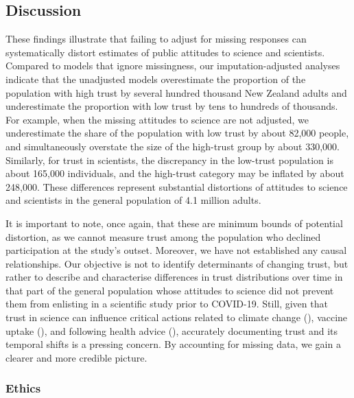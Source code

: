 \documentclass[
  single column]{article}
\begin{document}
\subsection{Discussion}\label{discussion}

These findings illustrate that failing to adjust for missing responses
can systematically distort estimates of public attitudes to science and
scientists. Compared to models that ignore missingness, our
imputation-adjusted analyses indicate that the unadjusted models
overestimate the proportion of the population with high trust by several
hundred thousand New Zealand adults and underestimate the proportion
with low trust by tens to hundreds of thousands. For example, when the
missing attitudes to science are not adjusted, we underestimate the
share of the population with low trust by about 82,000 people, and
simultaneously overstate the size of the high-trust group by about
330,000. Similarly, for trust in scientists, the discrepancy in the
low-trust population is about 165,000 individuals, and the high-trust
category may be inflated by about 248,000. These differences represent
substantial distortions of attitudes to science and scientists in the
general population of 4.1 million adults.

It is important to note, once again, that these are minimum bounds of
potential distortion, as we cannot measure trust among the population
who declined participation at the study's outset. Moreover, we have not
established any causal relationships. Our objective is not to identify
determinants of changing trust, but rather to describe and characterise
differences in trust distributions over time in that part of the general
population whose attitudes to science did not prevent them from
enlisting in a scientific study prior to COVID-19. Still, given that
trust in science can influence critical actions related to climate
change (),
vaccine uptake (), and following health advice
(),
accurately documenting trust and its temporal shifts is a pressing
concern. By accounting for missing data, we gain a clearer and more
credible picture.

\newpage{}

\subsubsection{Ethics}\label{ethics}
\end{document}
